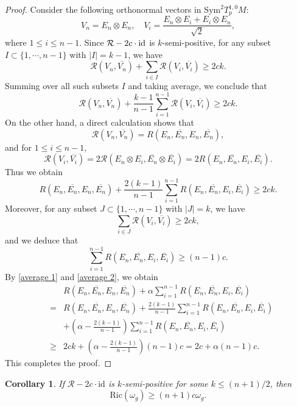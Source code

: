\documentclass[12pt,reqno]{amsart}
\newcommand\sR{{\mathcal R}}
\newcommand{\id}{{\rm id}}
\theoremstyle{plain}
\newtheorem{cor}[thm]{Corollary}
\theoremstyle{definition}
\newcommand{\bcorollary}{\begin{cor}}
\newcommand{\ecorollary}{\end{cor}}
\renewcommand{\bar}{\overline}
\newcommand{\beq}{\begin{equation}}
\newcommand{\eeq}{\end{equation}}
\newcommand{\ee}{\end{eqnarray*}}
\newcommand{\be}{\begin{eqnarray*}}
\renewcommand{\>}{\rightarrow}
\numberwithin{equation}{section} %
\newcommand{\om}{\omega}
\renewcommand{\leq}{\leqslant}
\renewcommand{\geq}{\geqslant}
\begin{document}
\begin{proof}
    Consider the following orthonormal vectors in $\mathrm{Sym}^2 T^{1,0}_pM$:
    \beq
    V_n=E_n\otimes E_n,\quad V_i=\frac{E_n\otimes E_i+E_i\otimes E_n}{\sqrt{2}},
    \eeq
    where $1\leq i\leq n-1$. Since $\sR-2c\cdot\id$ is $k$-semi-positive, for any subset $I\subset \{1,\cdots,n-1\}$ with $|I|=k-1$, we have
    \beq
    \sR\left(V_n,\bar{V_n}\right)+\sum_{i\in I} \sR\left(V_i,\bar{V_i}\right)\geq 2ck.
    \eeq
    Summing over all such subsets $I$ and taking average, we conclude that
    \beq
    \sR\left(V_n,\bar{V_n}\right)+\frac{k-1}{n-1}\sum_{i=1}^{n-1} \sR\left(V_i,\bar{V_i}\right)\geq 2ck.
    \eeq
    On the other hand, a direct calculation shows that
    \beq
    \sR\left(V_n,\bar{V_n}\right) = R\left(E_n,\bar{E_n},E_n,\bar{E_n}\right),
    \eeq
    and for $1\leq i\leq n-1$,
    \beq
    \sR\left(V_i,\bar{V_i}\right)=2\sR\left(E_n\otimes E_i,\bar{E_n}\otimes \bar{E_i}\right)=2R\left(E_n,\bar{E_n},E_i,\bar{E_i}\right).
    \eeq
    Thus we obtain
    \beq
    R\left(E_n,\bar{E_n},E_n,\bar{E_n}\right)+\frac{2(k-1)}{n-1}\sum_{i=1}^{n-1}R\left(E_n,\bar{E_n},E_i,\bar{E_i}\right)\geq 2ck.
    \label{average 1}
    \eeq
    Moreover, for any subset $J\subset \{1,\cdots,n-1\}$ with $|J|=k$, we have
    \beq
    \sum_{i\in J} \sR\left(V_i,\bar{V_i}\right)\geq 2ck,
    \eeq
    and we deduce that
    \beq
    \sum_{i=1}^{n-1}R\left(E_n,\bar{E_n},E_i,\bar{E_i}\right)\geq (n-1)c.
    \label{average 2}
    \eeq
    By \eqref{average 1} and \eqref{average 2}, we obtain
    \be && R\left(E_n,\bar{E_n},E_n,\bar{E_n}\right)
    +\alpha \sum_{i=1}^{n-1}R\left(E_n,\bar{E_n},E_i,\bar{E_i}\right)\\
    &=&  R\left(E_n,\bar{E_n},E_n,\bar{E_n}\right)
    +\frac{2(k-1)}{n-1} \sum_{i=1}^{n-1}R\left(E_n,\bar{E_n},E_i,\bar{E_i}\right)\\&&+\left(\alpha-\frac{2(k-1)}{n-1}\right) \sum_{i=1}^{n-1}R\left(E_n,\bar{E_n},E_i,\bar{E_i}\right)\\
    &\geq & 2ck+\left(\alpha-\frac{2(k-1)}{n-1}\right)(n-1)c=2c+\alpha(n-1)c.
    \ee
    This completes the proof.
\end{proof}

\bcorollary\label{symmetry to ric} If $\sR-2c\cdot \mathrm{id}$ is
$k$-semi-positive for some $k\leq (n+1)/2$, then \beq
\mathrm{Ric}(\omega_g)\geq (n+1)c\om_g. \eeq \ecorollary
\end{document}

